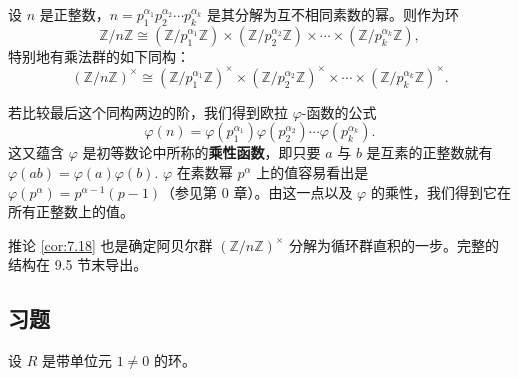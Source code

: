 \begin{corollary}\label{cor:7.18}
设 \(n\) 是正整数，\(n = p_1^{\alpha_1}p_2^{\alpha_2}\cdots p_k^{\alpha_k}\) 是其分解为互不相同素数的幂。则作为环
\[
\mathbb{Z}/n\mathbb{Z} \cong (\mathbb{Z}/p_1^{\alpha_1}\mathbb{Z}) \times (\mathbb{Z}/p_2^{\alpha_2}\mathbb{Z}) \times \cdots \times (\mathbb{Z}/p_k^{\alpha_k}\mathbb{Z}),
\]
特别地有乘法群的如下同构：
\[
(\mathbb{Z}/n\mathbb{Z})^\times \cong (\mathbb{Z}/p_1^{\alpha_1}\mathbb{Z})^\times \times (\mathbb{Z}/p_2^{\alpha_2}\mathbb{Z})^\times \times \cdots \times (\mathbb{Z}/p_k^{\alpha_k}\mathbb{Z})^\times.
\]
\end{corollary}

若比较最后这个同构两边的阶，我们得到欧拉 \(\varphi\)-函数的公式
\[
\varphi(n) = \varphi(p_1^{\alpha_1})\varphi(p_2^{\alpha_2})\cdots\varphi(p_k^{\alpha_k}).
\]
这又蕴含 \(\varphi\) 是初等数论中所称的\textbf{乘性函数}，即只要 \(a\) 与 \(b\) 是互素的正整数就有 \(\varphi(ab) = \varphi(a)\varphi(b)\). \(\varphi\) 在素数幂 \(p^\alpha\) 上的值容易看出是 \(\varphi(p^\alpha) = p^{\alpha-1}(p-1)\)（参见第 0 章）。由这一点以及 \(\varphi\) 的乘性，我们得到它在所有正整数上的值。

推论 \ref{cor:7.18} 也是确定阿贝尔群 \((\mathbb{Z}/n\mathbb{Z})^\times\) 分解为循环群直积的一步。完整的结构在 9.5 节末导出。

\subsection*{习题}
设 \(R\) 是带单位元 \(1 \neq 0\) 的环。

